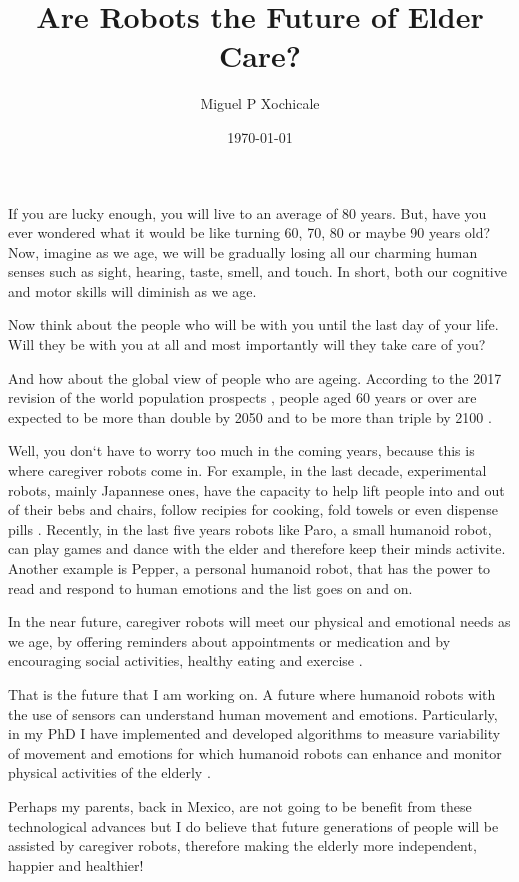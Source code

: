\documentclass[12pt]{article}
\author{Miguel P Xochicale}
\title{ Are Robots the Future of Elder Care?  }
\date{\today}
\begin{document}
\maketitle

If you are lucky enough, you will live to an average of 80 years.
But, have you ever wondered what it would be like turning 60, 70, 80 or maybe 90 years old?
Now, imagine as we age, we will be gradually losing all our
charming human senses such as sight, hearing, taste, smell, and touch.
In short, both our cognitive and motor skills will diminish as we age.

Now think about the people who will be with you until the last day of your life.
Will they be with you at all 
and most importantly will they take care of you?

And how about the global view of people who are ageing.
According to the 2017 revision of the world population prospects \cite{un2017}, 
people aged 60 years or over
are expected to be more than double by 2050 and to be more than triple by 2100 \cite{unb2017}.

Well, you don`t have to worry too much in the coming years, 
because this is where caregiver robots come in.
For example, in the last decade, experimental robots, mainly Japannese ones, 
have the capacity to help lift people into and out of their bebs and chairs,
follow recipies for cooking, fold towels or even dispense pills \cite{matuszek2017}.
Recently, in the last five years robots like
Paro, a small humanoid robot, can play games and dance with the elder
and therefore keep their minds activite.
Another example is Pepper, a personal humanoid robot, that has the power 
to read and respond to human emotions \cite{hay2015}
and the list goes on and on.

In the near future, caregiver robots will meet our physical and emotional needs as we age,
by offering reminders about appointments or medication 
and by encouraging social activities, healthy eating and exercise \cite{aronson2014}.

That is the future that I am working on.
A future where humanoid robots with the use of sensors can understand human movement and emotions.
Particularly, in my PhD I have implemented and developed algorithms to measure 
variability of movement and emotions 
for which humanoid robots can enhance and monitor physical activities of the elderly \cite{xochicale2018}.

Perhaps my parents, back in Mexico, are not going to be benefit 
from these technological advances 
but I do believe that future generations of people will be assisted by caregiver robots,
therefore making the elderly more independent, happier and healthier!
\end{document}
